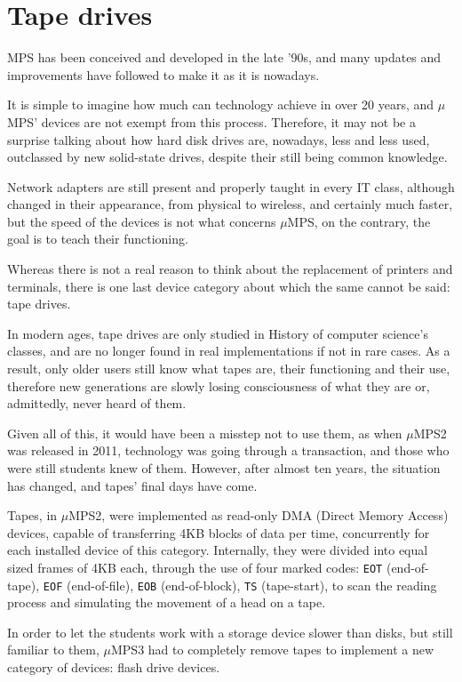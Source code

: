 \documentclass[12pt,a4paper,openright,twoside]{report}
\begin{document}
\section{Tape drives}
	MPS has been conceived and developed in the late '90s, and many updates and improvements have followed to make it as it is nowadays.

	It is simple to imagine how much can technology achieve in over 20 years, and $\mu$MPS' devices are not exempt from this process.
	Therefore, it may not be a surprise talking about how hard disk drives are, nowadays, less and less used, outclassed by new solid-state drives, despite their still being common knowledge.

	Network adapters are still present and properly taught in every IT class, although changed in their appearance, from physical to wireless, and certainly much faster, but the speed of the devices is not what concerns $\mu$MPS, on the contrary, the goal is to teach their functioning.

	Whereas there is not a real reason to think about the replacement of printers and terminals, there is one last device category about which the same cannot be said: tape drives.

	In modern ages, tape drives are only studied in History of computer science's classes, and are no longer found in real implementations if not in rare cases.
	As a result, only older users still know what tapes are, their functioning and their use, therefore new generations are slowly losing consciousness of what they are or, admittedly, never heard of them.

	Given all of this, it would have been a misstep not to use them, as when $\mu$MPS2 was released in 2011, technology was going through a transaction, and those who were still students knew of them. However, after almost ten years, the situation has changed, and tapes' final days have come.
  
	Tapes, in $\mu$MPS2, were implemented as read-only DMA (Direct Memory Access) devices, capable of transferring 4KB blocks of data per time, concurrently for each installed device of this category.
	Internally, they were divided into equal sized frames of 4KB each, through the use of four marked codes: \texttt{EOT} (end-of-tape), \texttt{EOF} (end-of-file), \texttt{EOB} (end-of-block), \texttt{TS} (tape-start), to scan the reading process and simulating the movement of a head on a tape.

	In order to let the students work with a storage device slower than disks, but still familiar to them, $\mu$MPS3 had to completely remove tapes to implement a new category of devices: flash drive devices.
\end{document}
